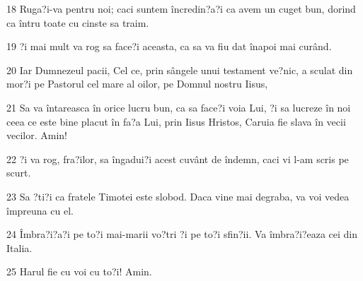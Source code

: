 \par 18 Ruga?i-va pentru noi; caci suntem încredin?a?i ca avem un cuget bun, dorind ca întru toate cu cinste sa traim.
\par 19 ?i mai mult va rog sa face?i aceasta, ca sa va fiu dat înapoi mai curând.
\par 20 Iar Dumnezeul pacii, Cel ce, prin sângele unui testament ve?nic, a sculat din mor?i pe Pastorul cel mare al oilor, pe Domnul nostru Iisus,
\par 21 Sa va întareasca în orice lucru bun, ca sa face?i voia Lui, ?i sa lucreze în noi ceea ce este bine placut în fa?a Lui, prin Iisus Hristos, Caruia fie slava în vecii vecilor. Amin!
\par 22 ?i va rog, fra?ilor, sa îngadui?i acest cuvânt de îndemn, caci vi l-am scris pe scurt.
\par 23 Sa ?ti?i ca fratele Timotei este slobod. Daca vine mai degraba, va voi vedea împreuna cu el.
\par 24 Îmbra?i?a?i pe to?i mai-marii vo?tri ?i pe to?i sfin?ii. Va îmbra?i?eaza cei din Italia.
\par 25 Harul fie cu voi cu to?i! Amin.


